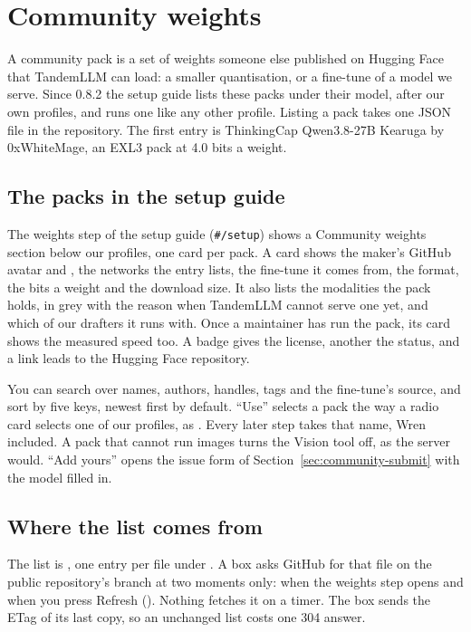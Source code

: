\chapter{Community weights}\label{ch:community}

A community pack is a set of weights someone else published on Hugging Face that TandemLLM can load: a smaller quantisation, or a fine-tune of a model we serve. Since 0.8.2 the setup guide lists these packs under their model, after our own profiles, and  runs one like any other profile. Listing a pack takes one JSON file in the repository. The first entry is ThinkingCap Qwen3.8-27B Kearuga by 0xWhiteMage, an EXL3 pack at 4.0 bits a weight.

\section{The packs in the setup guide}\label{sec:community-guide}

The weights step of the setup guide (\texttt{\#/setup}) shows a Community weights section below our profiles, one card per pack. A card shows the maker's GitHub avatar and , the networks the entry lists, the fine-tune it comes from, the format, the bits a weight and the download size. It also lists the modalities the pack holds, in grey with the reason when TandemLLM cannot serve one yet, and which of our drafters it runs with. Once a maintainer has run the pack, its card shows the measured speed too. A badge gives the license, another the status, and a link leads to the Hugging Face repository.

You can search over names, authors, handles, tags and the fine-tune's source, and sort by five keys, newest first by default. \enquote{Use} selects a pack the way a radio card selects one of our profiles, as . Every later step takes that name, Wren included. A pack that cannot run images turns the Vision tool off, as the server would. \enquote{Add yours} opens the issue form of Section~\ref{sec:community-submit} with the model filled in.

\section{Where the list comes from}\label{sec:community-sync}

The list is , one entry per file under . A box asks GitHub for that file on the public repository's  branch at two moments only: when the weights step opens and when you press Refresh (). Nothing fetches it on a timer. The box sends the ETag of its last copy, so an unchanged list costs one 304 answer.

